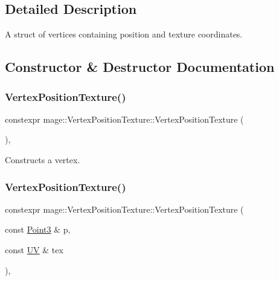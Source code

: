 \subsection{Detailed Description}
A struct of vertices containing position and texture coordinates. 

\subsection{Constructor \& Destructor Documentation}
\hypertarget{structmage_1_1_vertex_position_texture_a379985c00ba410c173e1e1c269ae33ee}{}\label{structmage_1_1_vertex_position_texture_a379985c00ba410c173e1e1c269ae33ee} 
\subsubsection{\texorpdfstring{Vertex\+Position\+Texture()}{VertexPositionTexture()}\hspace{0.1cm}{\footnotesize\ttfamily [1/4]}}
{\footnotesize\ttfamily constexpr mage\+::\+Vertex\+Position\+Texture\+::\+Vertex\+Position\+Texture (\begin{DoxyParamCaption}{ }\end{DoxyParamCaption})\hspace{0.3cm}{\ttfamily [default]}, {\ttfamily [noexcept]}}

Constructs a vertex. \hypertarget{structmage_1_1_vertex_position_texture_a3370852aca7ddbcb58f9c0629683649b}{}\label{structmage_1_1_vertex_position_texture_a3370852aca7ddbcb58f9c0629683649b} 
\subsubsection{\texorpdfstring{Vertex\+Position\+Texture()}{VertexPositionTexture()}\hspace{0.1cm}{\footnotesize\ttfamily [2/4]}}
{\footnotesize\ttfamily constexpr mage\+::\+Vertex\+Position\+Texture\+::\+Vertex\+Position\+Texture (\begin{DoxyParamCaption}\item[{const \hyperlink{structmage_1_1_point3}{Point3} \&}]{p,  }\item[{const \hyperlink{structmage_1_1_u_v}{UV} \&}]{tex }\end{DoxyParamCaption})\hspace{0.3cm}{\ttfamily [explicit]}, {\ttfamily [noexcept]}}


